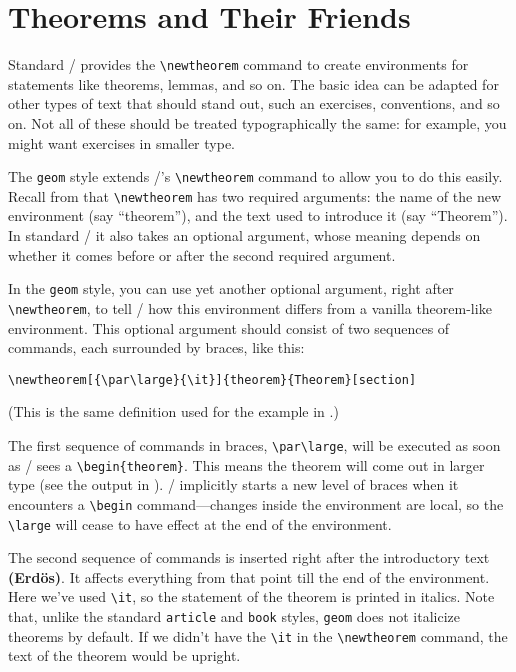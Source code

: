 \section{Theorems and Their Friends}

Standard \latex/ provides the \verb+\newtheorem+ command to create
environments for statements like theorems, lemmas, and so on.
The basic idea can be adapted for other types of text that should
stand out, such an exercises, conventions, and so on.
Not all of these should be treated typographically the same: for
example, you might want exercises in smaller type.

The \verb+geom+ style extends \latex/'s \verb+\newtheorem+ command
to allow you to do this easily.  Recall from \cite[58]{Lamport} that
\verb+\newtheorem+ has two required arguments: the name of the new
environment (say ``theorem''), and the text used to introduce it (say
``Theorem''). In standard \latex/ it also takes an optional argument,
whose meaning depends on whether it comes before or after the second
required argument.

In the \verb+geom+ style, you can use yet another optional argument,
right after \verb+\newtheorem+, to tell \latex/ how this environment
differs from a vanilla theorem-like environment.  This optional
argument should consist of two sequences of commands, each surrounded
by braces, like this:
%
\begin{verbatim}
\newtheorem[{\par\large}{\it}]{theorem}{Theorem}[section]
\end{verbatim}
%
(This is the same definition used for the
example in .)

The first sequence of commands in braces, \verb+\par\large+, will be
executed as soon as \latex/ sees a \verb+\begin{theorem}+.  This means
the theorem will come out in larger type (see the output in
).  \latex/ implicitly starts a
new level of braces when it encounters a \verb+\begin+
command---changes inside the environment are local, so the
\verb+\large+ will cease to have effect at the end of the environment.

The second sequence of commands is inserted right after the
introductory text {\bf{\def\preref#1{#1} } (Erd\"os)}.  It affects
everything from that point till the end of the environment.  Here
we've used \verb+\it+, so the statement of the theorem is printed in
italics.  Note that, unlike the standard \verb+article+ and
\verb+book+ styles, \verb+geom+ does not italicize theorems by
default.  If we didn't have the \verb+\it+ in the \verb+\newtheorem+
command, the text of the theorem would be upright.

